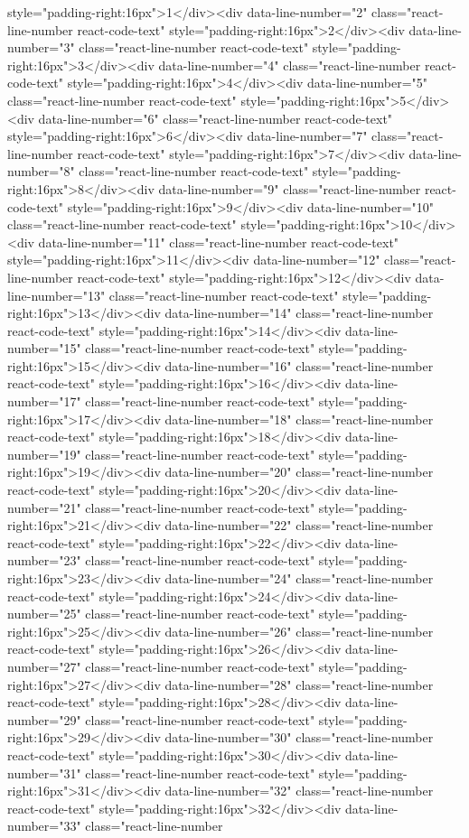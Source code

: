 {{{{{{{{{{{{{{{{{{{{{{{{{{{{{style="padding-right:16px">1</div><div data-line-number="2" class="react-line-number react-code-text" style="padding-right:16px">2</div><div data-line-number="3" class="react-line-number react-code-text" style="padding-right:16px">3</div><div data-line-number="4" class="react-line-number react-code-text" style="padding-right:16px">4</div><div data-line-number="5" class="react-line-number react-code-text" style="padding-right:16px">5</div><div data-line-number="6" class="react-line-number react-code-text" style="padding-right:16px">6</div><div data-line-number="7" class="react-line-number react-code-text" style="padding-right:16px">7</div><div data-line-number="8" class="react-line-number react-code-text" style="padding-right:16px">8</div><div data-line-number="9" class="react-line-number react-code-text" style="padding-right:16px">9</div><div data-line-number="10" class="react-line-number react-code-text" style="padding-right:16px">10</div><div data-line-number="11" class="react-line-number react-code-text" style="padding-right:16px">11</div><div data-line-number="12" class="react-line-number react-code-text" style="padding-right:16px">12</div><div data-line-number="13" class="react-line-number react-code-text" style="padding-right:16px">13</div><div data-line-number="14" class="react-line-number react-code-text" style="padding-right:16px">14</div><div data-line-number="15" class="react-line-number react-code-text" style="padding-right:16px">15</div><div data-line-number="16" class="react-line-number react-code-text" style="padding-right:16px">16</div><div data-line-number="17" class="react-line-number react-code-text" style="padding-right:16px">17</div><div data-line-number="18" class="react-line-number react-code-text" style="padding-right:16px">18</div><div data-line-number="19" class="react-line-number react-code-text" style="padding-right:16px">19</div><div data-line-number="20" class="react-line-number react-code-text" style="padding-right:16px">20</div><div data-line-number="21" class="react-line-number react-code-text" style="padding-right:16px">21</div><div data-line-number="22" class="react-line-number react-code-text" style="padding-right:16px">22</div><div data-line-number="23" class="react-line-number react-code-text" style="padding-right:16px">23</div><div data-line-number="24" class="react-line-number react-code-text" style="padding-right:16px">24</div><div data-line-number="25" class="react-line-number react-code-text" style="padding-right:16px">25</div><div data-line-number="26" class="react-line-number react-code-text" style="padding-right:16px">26</div><div data-line-number="27" class="react-line-number react-code-text" style="padding-right:16px">27</div><div data-line-number="28" class="react-line-number react-code-text" style="padding-right:16px">28</div><div data-line-number="29" class="react-line-number react-code-text" style="padding-right:16px">29</div><div data-line-number="30" class="react-line-number react-code-text" style="padding-right:16px">30</div><div data-line-number="31" class="react-line-number react-code-text" style="padding-right:16px">31</div><div data-line-number="32" class="react-line-number react-code-text" style="padding-right:16px">32</div><div data-line-number="33" class="react-line-number }}}}}}}}}}}}}}}}}}}}}}}}}}}}}
